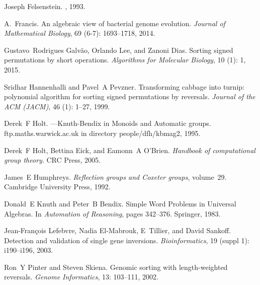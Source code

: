 \documentclass[utf8]{Frontiers_LaTex_Templates/frontiersFPHY} %
\numberwithin{equation}{section}
\begin{document}
\begin{thebibliography}{38}
Joseph Felsenstein.
, 1993.

A.~Francis.
\newblock An algebraic view of bacterial genome evolution.
\newblock \emph{Journal of Mathematical Biology}, 69 (6-7):
  1693--1718, 2014.

Gustavo~Rodrigues Galv{\~a}o, Orlando Lee, and Zanoni Dias.
\newblock Sorting signed permutations by short operations.
\newblock \emph{Algorithms for Molecular Biology}, 10 (1): 1,
  2015.

Sridhar Hannenhalli and Pavel~A Pevzner.
\newblock Transforming cabbage into turnip: polynomial algorithm for sorting
  signed permutations by reversals.
\newblock \emph{Journal of the ACM (JACM)}, 46 (1): 1--27,
  1999.

Derek~F Holt.
---{K}nuth-{B}endix in {M}onoids and {A}utomatic groups.
\newblock ftp.maths.warwick.ac.uk in directory people/dfh/kbmag2, 1995.

Derek~F Holt, Bettina Eick, and Eamonn~A O'Brien.
\newblock \emph{Handbook of computational group theory}.
\newblock CRC Press, 2005.

James~E Humphreys.
\newblock \emph{Reflection groups and Coxeter groups}, volume~29.
\newblock Cambridge University Press, 1992.

Donald~E Knuth and Peter~B Bendix.
\newblock Simple {W}ord {P}roblems in {U}niversal {A}lgebras.
\newblock In \emph{Automation of Reasoning}, pages 342--376. Springer, 1983.

Jean-Fran{\c{c}}ois Lefebvre, Nadia El-Mabrouk, E~Tillier, and David Sankoff.
\newblock Detection and validation of single gene inversions.
\newblock \emph{Bioinformatics}, 19 (suppl 1): i190--i196,
  2003.

Ron~Y Pinter and Steven Skiena.
\newblock Genomic sorting with length-weighted reversals.
\newblock \emph{Genome Informatics}, 13: 103--111, 2002.


\end{thebibliography}
\end{document}
